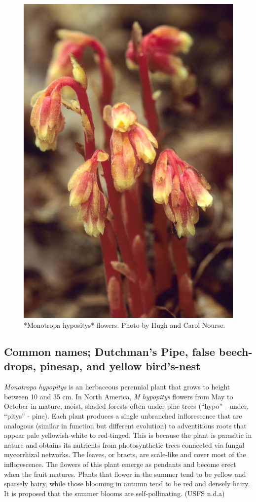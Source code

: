 \documentclass[
]{article}
\begin{document}
\begin{figure}

{\centering \includegraphics[width=0.5\linewidth]{M hypopitys} 

}

\caption{*Monotropa hypositys* flowers. Photo by Hugh and Carol Nourse.}\label{fig:hypopitys}
\end{figure}

\hypertarget{common-names-dutchmans-pipe-false-beech-drops-pinesap-and-yellow-birds-nest}{%
\subsection{Common names; Dutchman's Pipe, false beech-drops, pinesap, and yellow bird's-nest}\label{common-names-dutchmans-pipe-false-beech-drops-pinesap-and-yellow-birds-nest}}

\emph{Monotropa hypopitys} is an herbaceous perennial plant that grows to height between 10 and 35 cm. In North America, \emph{M hypopitys} flowers from May to October in mature, moist, shaded forests often under pine trees (``hypo'' - under, ``pitys'' - pine). Each plant produces a single unbranched inflorescence that are analogous (similar in function but different evolution) to adventitious roots that appear pale yellowish-white to red-tinged. This is because the plant is parasitic in nature and obtains its nutrients from photosynthetic trees connected via fungal mycorrhizal networks. The leaves, or bracts, are scale-like and cover most of the inflorescence. The flowers of this plant emerge as pendants and become erect when the fruit matures. Plants that flower in the summer tend to be yellow and sparsely hairy, while those blooming in autumn tend to be red and densely hairy. It is proposed that the summer blooms are self-pollinating. (USFS n.d.a)
\end{document}
